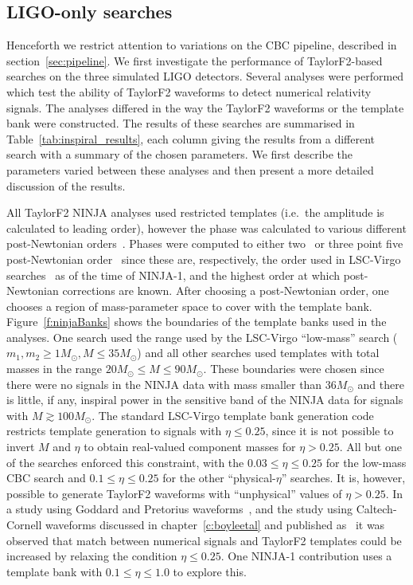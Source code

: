 \subsection{LIGO-only searches}
\label{ssec:ninja1_ligo}

Henceforth we restrict attention to variations on the CBC pipeline,
described in section~\ref{sec:pipeline}.  We first investigate the
performance of TaylorF2-based searches on the three simulated LIGO
detectors. Several analyses were performed which test the ability of
TaylorF2 waveforms to detect numerical relativity signals.  The
analyses differed in the way the TaylorF2 waveforms or the template
bank were constructed.  The results of these searches are summarised
in Table~\ref{tab:inspiral_results}, each column giving the results
from a different search with a summary of the chosen parameters.  We
first describe the parameters varied between these analyses and then
present a more detailed discussion of the results.

All TaylorF2 NINJA analyses used restricted templates (i.e.~the
amplitude is calculated to leading order), however the phase was
calculated to various different post-Newtonian
orders~\cite{Blanchet:2002av}. Phases were computed to either
two~\cite{Blanchet:1996pi,Blanchet:1995ez} or three point five
post-Newtonian
order~\cite{Blanchet:2001ax,PhysRevD.71.129902,Blanchet:2004ek} since
these are, respectively, the order used in LSC-Virgo
searches~\cite{Abbott:2009tt} as of the time of NINJA-1, and the
highest order at which post-Newtonian corrections are known. After
choosing a post-Newtonian order, one chooses a region of
mass-parameter space to cover with the template bank.
Figure~\ref{f:ninjaBanks} shows the boundaries of the template banks
used in the analyses. One search used the range used by the LSC-Virgo
``low-mass'' search \cite{Abbott:2009tt} ($m_1,m_2 \ge  1 M_\odot, M
\le 35 M_{\odot}$) and all other searches used templates with total
masses in the range $20 M_\odot \le M \le 90 M_\odot$.  These
boundaries were chosen since there were no signals in the NINJA data
with mass smaller than $36 M_\odot$ and there is little, if any,
inspiral power in the sensitive band of the NINJA data for signals
with $M \gtrsim 100 M_\odot$.  The standard LSC-Virgo template bank
generation code~\cite{Babak:2006ty} restricts template generation to
signals with $\eta \le 0.25$, since it is not possible to invert $M$
and $\eta$ to obtain real-valued component masses for $\eta > 0.25$.
All but one of the searches enforced this constraint, with the $0.03
\le \eta \le 0.25$ for the low-mass CBC search and $0.1 \le \eta \le
0.25$ for the other ``physical-$\eta$'' searches. It is, however,
possible to generate TaylorF2 waveforms with ``unphysical'' values of
$\eta > 0.25$.  In a study using Goddard and Pretorius
waveforms~\cite{Pan:2007nw}, and the study using Caltech-Cornell
waveforms discussed in chapter~\ref{c:boyleetal} and published
as~\cite{Boyle:2009dg} it was observed that match between numerical
signals and TaylorF2 templates could be increased by relaxing the
condition $\eta \le 0.25$. One NINJA-1 contribution uses a template bank
with $0.1 \le \eta \le 1.0$ to explore this.

